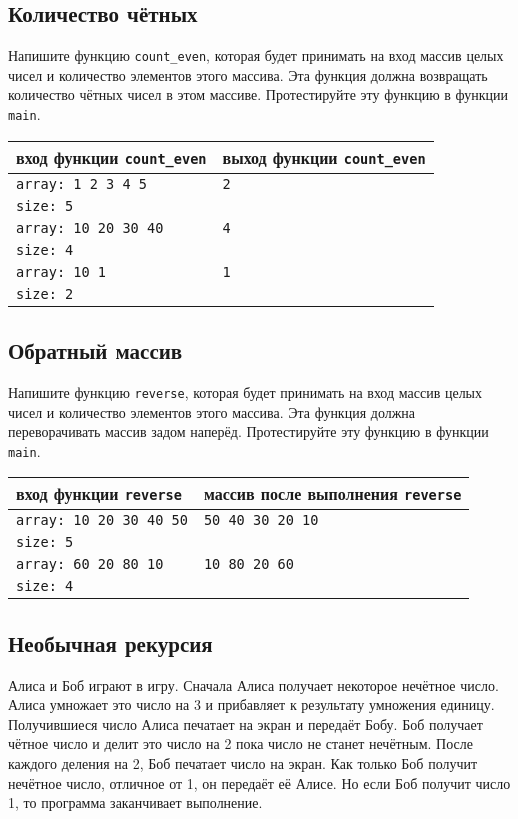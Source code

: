 \documentclass{article}
\begin{document}
\subsection{Количество чётных}
Напишите функцию \texttt{count\_even}, которая будет принимать на вход массив целых чисел и количество элементов этого массива. Эта функция должна возвращать количество чётных чисел в этом массиве. Протестируйте эту функцию в функции \texttt{main}.
\begin{center}
\begin{tabular}{ l | l }
 вход функции \texttt{count\_even} & выход функции \texttt{count\_even} \\ \hline
 \texttt{array: 1 2 3 4 5} & \texttt{2} \\
 \texttt{size: 5} & \\ \hline
 \texttt{array: 10 20 30 40} & \texttt{4} \\
 \texttt{size: 4} & \\ \hline
 \texttt{array: 10 1} & \texttt{1} \\
 \texttt{size: 2} & \\
\end{tabular}
\end{center} 
 




\subsection{Обратный массив}
Напишите функцию \texttt{reverse}, которая будет принимать на вход массив целых чисел и количество элементов этого массива. Эта функция должна переворачивать массив задом наперёд. Протестируйте эту функцию в функции \texttt{main}.
\begin{center}
\begin{tabular}{ l | l }
 вход функции \texttt{reverse} & массив после выполнения \texttt{reverse} \\ \hline
 \texttt{array: 10 20 30 40 50} & \texttt{50 40 30 20 10} \\
 \texttt{size: 5} & \\ \hline
 \texttt{array: 60 20 80 10} & \texttt{10 80 20 60} \\
 \texttt{size: 4} & \\
\end{tabular}
\end{center} 




\subsection{Необычная рекурсия}
Алиса и Боб играют в игру. Сначала Алиса получает некоторое нечётное число. Алиса умножает это число на 3 и прибавляет к результату умножения единицу. Получившиеся число Алиса печатает на экран и передаёт Бобу. Боб получает чётное число и делит это число на 2 пока число не станет нечётным. После каждого деления на 2, Боб печатает число на экран. Как только Боб получит нечётное число, отличное от 1, он передаёт её Алисе. Но если Боб получит число 1, то программа заканчивает выполнение.
\end{document}
